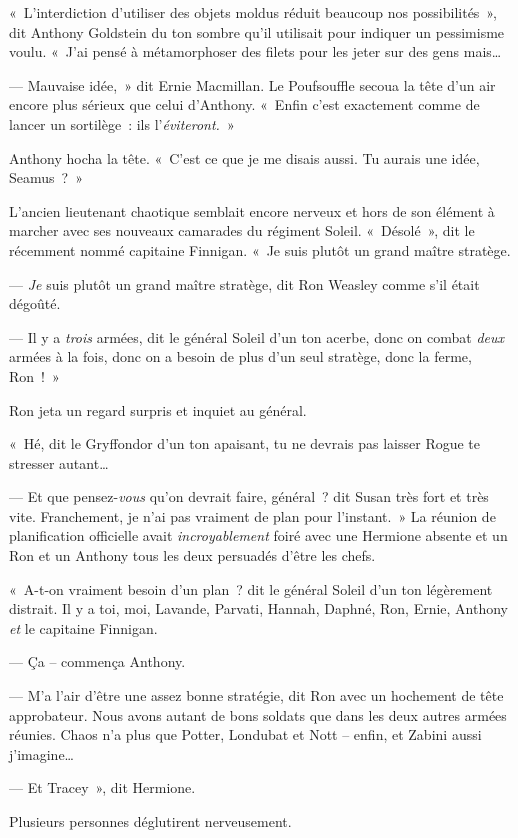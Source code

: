 «~L'interdiction d'utiliser des objets moldus réduit beaucoup nos possibilités~», dit Anthony Goldstein du ton sombre qu'il utilisait pour indiquer un pessimisme voulu. «~J'ai pensé à métamorphoser des filets pour les jeter sur des gens mais…

--- Mauvaise idée,~» dit Ernie Macmillan. Le Poufsouffle secoua la tête d'un air encore plus sérieux que celui d'Anthony. «~Enfin c'est exactement comme de lancer un sortilège~: ils l'\emph{éviteront.}~»

Anthony hocha la tête. «~C'est ce que je me disais aussi. Tu aurais une idée, Seamus~?~»

L'ancien lieutenant chaotique semblait encore nerveux et hors de son élément à marcher avec ses nouveaux camarades du régiment Soleil. «~Désolé~», dit le récemment nommé capitaine Finnigan. «~Je suis plutôt un grand maître stratège.

--- \emph{Je} suis plutôt un grand maître stratège, dit Ron Weasley comme s'il était dégoûté.

--- Il y a \emph{trois} armées, dit le général Soleil d'un ton acerbe, donc on combat \emph{deux} armées à la fois, donc on a besoin de plus d'un seul stratège, donc la ferme, Ron~!~»

Ron jeta un regard surpris et inquiet au général.

«~Hé, dit le Gryffondor d'un ton apaisant, tu ne devrais pas laisser Rogue te stresser autant…

--- Et que pensez-\emph{vous} qu'on devrait faire, général~? dit Susan très fort et très vite. Franchement, je n'ai pas vraiment de plan pour l'instant.~» La réunion de planification officielle avait \emph{incroyablement} foiré avec une Hermione absente et un Ron et un Anthony tous les deux persuadés d'être les chefs.

«~A-t-on vraiment besoin d'un plan~? dit le général Soleil d'un ton légèrement distrait. Il y a toi, moi, Lavande, Parvati, Hannah, Daphné, Ron, Ernie, Anthony \emph{et} le capitaine Finnigan.

--- Ça -- commença Anthony.

--- M'a l'air d'être une assez bonne stratégie, dit Ron avec un hochement de tête approbateur. Nous avons autant de bons soldats que dans les deux autres armées réunies. Chaos n'a plus que Potter, Londubat et Nott -- enfin, et Zabini aussi j'imagine…

--- Et Tracey~», dit Hermione.

Plusieurs personnes déglutirent nerveusement.

